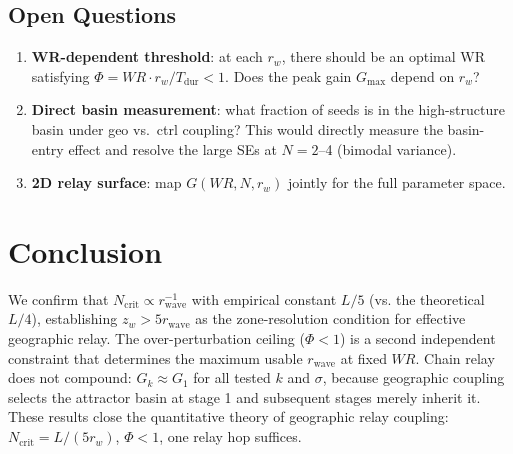 \documentclass[11pt]{article}
\begin{document}
\subsection{Open Questions}

\begin{enumerate}
  \item \textbf{WR-dependent threshold}: at each $r_w$, there should be an
        optimal WR satisfying $\Phi = WR \cdot r_w / T_\mathrm{dur} < 1$.
        Does the peak gain $G_\mathrm{max}$ depend on $r_w$?
  \item \textbf{Direct basin measurement}: what fraction of seeds is in the
        high-structure basin under geo vs.\ ctrl coupling?
        This would directly measure the basin-entry effect and resolve the
        large SEs at $N=2$--4 (bimodal variance).
  \item \textbf{2D relay surface}: map $G(WR, N, r_w)$ jointly for the
        full parameter space.
\end{enumerate}

\section{Conclusion}

We confirm that $N_\mathrm{crit} \propto r_\mathrm{wave}^{-1}$ with empirical
constant $L/5$ (vs. the theoretical $L/4$), establishing $z_w > 5r_\mathrm{wave}$
as the zone-resolution condition for effective geographic relay.
The over-perturbation ceiling ($\Phi < 1$) is a second independent constraint
that determines the maximum usable $r_\mathrm{wave}$ at fixed $WR$.
Chain relay does not compound: $G_k \approx G_1$ for all tested $k$ and $\sigma$,
because geographic coupling selects the attractor basin at stage 1 and
subsequent stages merely inherit it.
These results close the quantitative theory of geographic relay coupling:
$N_\mathrm{crit} = L/(5r_w)$, $\Phi < 1$, one relay hop suffices.
\end{document}
